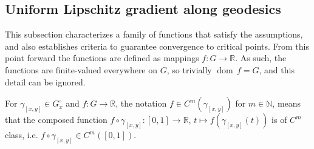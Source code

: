 \documentclass{article}
\theoremstyle{plain}\newtheorem{theorem}{Theorem}[section]
\theoremstyle{plain}\newtheorem{definition}[theorem]{Definition}
\theoremstyle{plain}\newtheorem{lemma}[theorem]{Lemma}
\theoremstyle{definition}\newtheorem{remark}[theorem]{Remark}
\theoremstyle{definition}\newtheorem{example}[theorem]{Example}
\theoremstyle{plain}\newtheorem{proposition}[theorem]{Proposition}
\theoremstyle{plain}\newtheorem{inference}[theorem]{Inference}
\theoremstyle{plain}\newtheorem{corollary}[theorem]{Corollary}
\theoremstyle{plain}\newtheorem{assumption}[theorem]{Assumption}
\DeclareMathOperator{\dom}{{dom\,}}
\newcommand{\Nbb}{\mathbb{N}}
\begin{document}
\subsection{Uniform Lipschitz gradient along geodesics}\label{s:Unif Lip}
This subsection characterizes a family of functions that satisfy the assumptions, and also establishes criteria to guarantee convergence to critical points. From this point forward the functions are defined as mappings $f:G\to\mathbb{R}$. As such, the functions are finite-valued everywhere on $G$, so trivially $\dom f=G$, and this detail can be ignored.

For $\gamma_{[x,y]}\in G_x^{\circ}$ and $f:G\to\mathbb{R}$, the notation $f\in C^m(\gamma_{[x,y]})$ for $m\in\Nbb$, means that the composed function $f\circ\gamma_{[x,y]}:[0,1]\to\mathbb{R}$, $t\mapsto f(\gamma_{[x,y]}(t))$ is of $C^m$ class, i.e. $f\circ\gamma_{[x,y]}\in C^m([0,1])$.
\end{document}
